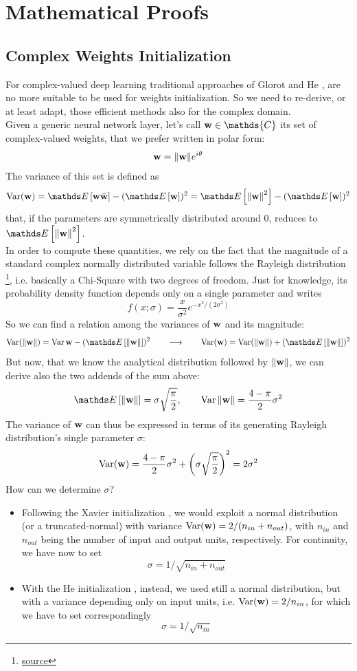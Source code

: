 \documentclass[../main.tex]{subfiles}
\begin{document}
	
\chapter{Mathematical Proofs}
\label{app:cmplx_optim}


\section{Complex Weights Initialization \cite{trabelsi2018deep}}
\label{app:weight_init}

For complex-valued deep learning traditional approaches of Glorot \cite{xavier_init} and He \cite{he2015delving}, are no more suitable to be used for weights initialization. So we need to re-derive, or at least adapt, those efficient methods also for the complex domain.\\
Given a generic neural network layer, let's call $\vb{w}\in\mathds{C}$ its set of complex-valued weights, that we prefer written in polar form:
\[ \vb{w} = \norm{\vb{w}}e^{i\theta} \]
The variance of this set is defined as 
\[ \Var(\vb{w}) = \Ev{\vb{w}\bar{\vb{w}}} - (\Ev{\vb{w}})^2 = \Ev{\norm{\vb{w}}^2} - (\Ev{\vb{w}})^2 \]
that, if the parameters are symmetrically distributed around 0, reduces to $\Ev{\norm{\vb{w}}^2}$.\\
In order to compute these quantities, we rely on the fact that the magnitude of a standard complex normally distributed variable follows the Rayleigh distribution \footnote{\href{https://en.wikipedia.org/wiki/Rayleigh\_distribution}{source}}, i.e. basically a Chi-Square with two degrees of freedom. Just for knowledge, its probability density function depends only on a single parameter and writes
\[ f(x; \sigma) = \frac{x}{\sigma^2}e^{-x^2 / (2\sigma^2)} \]
So we can find a relation among the variances of $\vb{w}$ and its magnitude:
\[ \Var(\norm{\vb{w}}) = \Var{\vb{w}} - (\Ev{\norm{\vb{w}}})^2 \qquad\longrightarrow\qquad \Var({\vb{w}}) = \Var(\norm{\vb{w}}) + (\Ev{\norm{\vb{w}}})^2 \]
But now, that we know the analytical distribution followed by $\norm{\vb{w}}$, we can derive also the two addends of the sum above:
\[ \Ev{\norm{\vb{w}}} = \sigma\sqrt{\frac{\pi}{2}}, \qquad \Var{\norm{\vb{w}}} = \frac{4-\pi}{2}\sigma^2 \]
The variance of $\vb{w}$ can thus be expressed in terms of its generating Rayleigh distribution's single parameter $\sigma$:
\[ \operatorname{Var}(\vb{w}) = \frac{4-\pi}{2}\sigma^2 + \left(\sigma\sqrt{\frac{\pi}{2}}\right)^2 = 2\sigma^2 \]
How can we determine $\sigma$?\\
\begin{itemize}
	\item Following the Xavier initialization \cite{xavier_init}, we would exploit a normal distribution (or a truncated-normal) with variance $\operatorname{Var}(\vb{w}) = 2 / (n_{in} + n_{out})$, with $n_{in}$ and $n_{out}$ being the number of input and output units, respectively. For continuity, we have now to set
	\[ \sigma = 1 / \sqrt{n_{in} + n_{out}} \]
	\item With the He initialization \cite{he2015delving}, instead, we used still a normal distribution, but with a variance depending only on input units, i.e. $\operatorname{Var}(\vb{w}) = 2/n_{in}$, for which we have to set correspondingly
	\[ \sigma = 1 / \sqrt{n_{in}} \]
\end{itemize}
\end{document}
